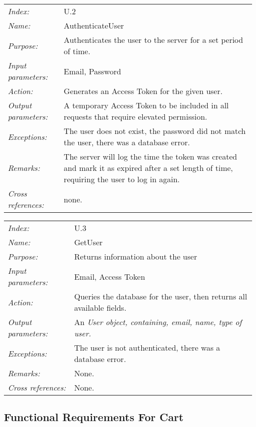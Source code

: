 \documentclass[10pt,letter]{article}
\begin{document}
\begin{tabularx}{\textwidth}{l X}
    \it{Index:} & U.2 \\
    \it{Name:} & AuthenticateUser \\
    \it{Purpose:} & Authenticates the user to the server for a set period of time. \\
    \it{Input parameters:} & Email, Password \\
    \it{Action:} & Generates an Access Token for the given user. \\
    \it{Output parameters:} & A temporary Access Token to be included in all requests that require elevated permission. \\
    \it{Exceptions:} & The user does not exist, the password did not match the user, there was a database error. \\
    \it{Remarks:} & The server will log the time the token was created and mark it as expired after a set length of time, 
    requiring the user to log in again. \\
    \it{Cross references:} & none. \\
    \hline
\end{tabularx}

\begin{tabularx}{\textwidth}{l X}
    \it{Index:} & U.3 \\
    \it{Name:} & GetUser \\
    \it{Purpose:} & Returns information about the user \\
    \it{Input parameters:} & Email, Access Token \\
    \it{Action:} & Queries the database for the user, then returns all available fields. \\
    \it{Output parameters:} &  An \it{User} object, containing, email, name, type of user.\\
    \it{Exceptions:} & The user is not authenticated, there was a database error. \\
    \it{Remarks:} & None. \\
    \it{Cross references:} & None. \\
    \hline
\end{tabularx}

\subsection{Functional Requirements For Cart}
\end{document}

